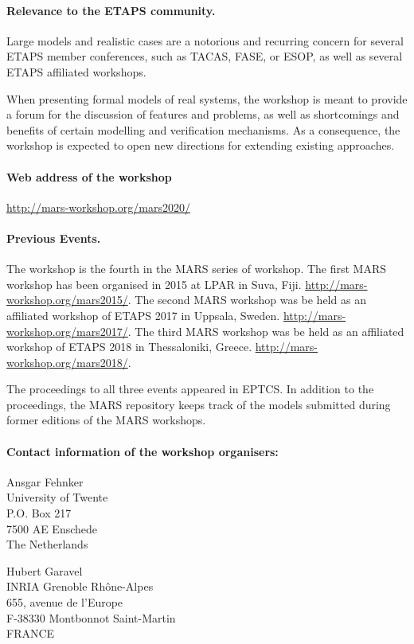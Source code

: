 \documentclass{article}
\begin{document}
\paragraph*{Relevance to the ETAPS community.}

Large models and realistic cases are a notorious and recurring concern
for several ETAPS member conferences, such as TACAS, FASE, or ESOP, as
well as several ETAPS affiliated workshops.

When presenting formal models of real systems, the workshop is meant
to provide a forum for the discussion of features and problems, as
well as shortcomings and benefits of certain modelling and
verification mechanisms.  As a consequence, the workshop is expected to
open new directions for extending existing approaches.


\paragraph{Web address of the workshop}
\url{http://mars-workshop.org/mars2020/}

\paragraph*{Previous Events.}
The workshop is the fourth in the MARS series of workshop.
 The first MARS workshop has
been organised in 2015 at LPAR in Suva, Fiji.
\url{http://mars-workshop.org/mars2015/}. 
The second MARS workshop was be held as an affiliated workshop of
ETAPS 2017 in Uppsala, Sweden. 
\url{http://mars-workshop.org/mars2017/}.
The third MARS workshop was be held as an affiliated workshop of
ETAPS 2018 in Thessaloniki, Greece. 
\url{http://mars-workshop.org/mars2018/}.

The proceedings to all three events appeared in EPTCS. In addition to the proceedings, the MARS repository keeps track of the
models submitted during former editions of the MARS workshops.

\paragraph{Contact information of the workshop organisers:}
\begin{description}
\item{Ansgar Fehnker}\\ University of Twente\\
P.O. Box 217\\
7500 AE Enschede\\
The Netherlands

\item{Hubert Garavel}\\
INRIA Grenoble Rh\^{o}ne-Alpes\\ 
655, avenue de l'Europe \\
F-38330 Montbonnot Saint-Martin\\ 
FRANCE 
\end{description}
\end{document}
